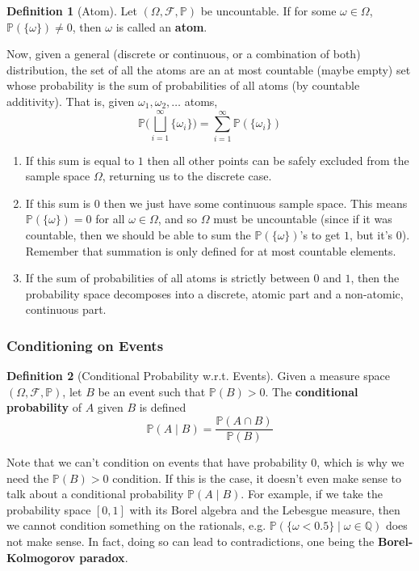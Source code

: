 \documentclass{article}
\theoremstyle{definition}
\theoremstyle{remark}
\theoremstyle{definition}
\newtheorem{definition}{Definition}[section]
\begin{document}
\begin{definition}[Atom]
Let $(\Omega, \mathcal{F}, \mathbb{P})$ be uncountable. If for some $\omega \in \Omega$, $\mathbb{P}(\{\omega\}) \neq 0$, then $\omega$ is called an \textbf{atom}. 
\end{definition}

Now, given a general (discrete or continuous, or a combination of both) distribution, the set of all the atoms are an at most countable (maybe empty) set whose probability is the sum of probabilities of all atoms (by countable additivity). That is, given $\omega_1, \omega_2, \ldots$ atoms, 
\[\mathbb{P} \bigg( \bigsqcup_{i=1}^\infty \{\omega_i\} \bigg) = \sum_{i=1}^\infty \mathbb{P}(\{\omega_i\})\]
\begin{enumerate}
    \item If this sum is equal to $1$ then all other points can be safely excluded from the sample space $\Omega$, returning us to the discrete case. 
    \item If this sum is $0$ then we just have some continuous sample space. This means $\mathbb{P}(\{\omega\}) = 0$ for all $\omega \in \Omega$, and so $\Omega$ must be uncountable (since if it was countable, then we should be able to sum the $\mathbb{P}(\{\omega\})$'s to get $1$, but it's $0$). Remember that summation is only defined for at most countable elements. 
    \item If the sum of probabilities of all atoms is strictly between $0$ and $1$, then the probability space decomposes into a discrete, atomic part and a non-atomic, continuous part. 
\end{enumerate}

\subsubsection{Conditioning on Events}

\begin{definition}[Conditional Probability w.r.t. Events]
Given a measure space $(\Omega, \mathcal{F}, \mathbb{P})$, let $B$ be an event such that $\mathbb{P}(B) > 0$. The \textbf{conditional probability} of $A$ given $B$ is defined 
\[\mathbb{P}(A \mid B) = \frac{\mathbb{P}(A \cap B)}{\mathbb{P}(B)}\]
\end{definition}

Note that we can't condition on events that have probability $0$, which is why we need the $\mathbb{P}(B) > 0$ condition. If this is the case, it doesn't even make sense to talk about a conditional probability $\mathbb{P}(A \mid B)$. For example, if we take the probability space $[0, 1]$ with its Borel algebra and the Lebesgue measure, then we cannot condition something on the rationals, e.g. $\mathbb{P}(\{\omega < 0.5\} \mid \omega \in \mathbb{Q})$ does not make sense. In fact, doing so can lead to contradictions, one being the \textbf{Borel-Kolmogorov paradox}. 
\end{document}
